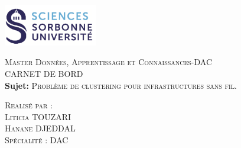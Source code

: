 \documentclass{article}
\begin{document}
\begin{titlepage}
    \begin{flushleft}
    \includegraphics[width=11em]{logo.png}\\[1.5cm]
    \end{flushleft}
    \begin{center}
        \textsc{{\LARGE \color{blue} Master Données, Apprentissage et Connaissances-DAC}}\\[5cm]
        \textsc{\Huge{CARNET DE BORD}}\\[1cm]
        \textbf{\Large{Sujet:}}
        \textsc{\large{Problème de clustering pour infrastructures sans fil.}}\\[6cm]
        \begin{minipage}{1\textwidth}
            \begin{flushleft} \large
            \textsc{\LARGE{Realisé par :}}\\[0.5cm]
            \textsc{Liticia TOUZARI}\\
            \textsc{Hanane DJEDDAL}\\[0.5cm]
            \textsc{Spécialité : DAC }\\ [1.5 cm]
            \end{flushleft}
        \end{minipage}
        \vfill
    \end{center}
  \end{titlepage}
  

\tableofcontents%


\newpage
\end{document}
